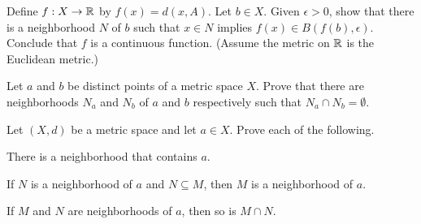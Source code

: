 Define $f: X \to \mathbb{R}$ by $f(x) = d(x,A)$. Let $b \in X$. Given $\epsilon > 0$, show that there is a neighborhood $N$ of $b$ such that $x \in N$ implies $f(x) \in B(f(b),\epsilon)$. Conclude that $f$ is a continuous function. (Assume the metric on $\mathbb{R}$ is the Euclidean metric.)


\begin{comment}

\ExerciseSolution Define $f: X \to \R$ by $f(x) = d(x,A)$. Let $b \in X$ and let $\epsilon$ be greater than $0$. Let $N = B(b, \epsilon)$.  We know that $N$ is a neighborhood of $b$. Suppose $x \in N$. Part i. shows that  
\[d(b,A) \leq d(b,x) + d(x,A) < \epsilon+d(x,A).\]
 So $d(b,A) - d(x,A) < \epsilon$ and $-\epsilon < d(x,A) - d(b,A)$. It follows that $|d(b,A) - d(x,A)| < \epsilon$ and $f(x) \in B(f(a),\epsilon)$.  This shows that $f$ is a continuous function.  


\end{comment}


\item Let $a$ and $b$ be distinct points of a metric space $X$. Prove that there are neighborhoods $N_a$ and $N_b$ of $a$ and $b$ respectively such that $N_a \cap N_b = \emptyset$.  

\begin{comment}

\ExerciseSolution Let $a$ and $b$ be distinct points of a metric space $(X,d)$. Since $a \neq b$, we know that $d(a,b) > 0$. Let $r = \frac{d(a,b)}{2}$. By definition, $N_a = B(a; r)$ and $N_b = B(b; r)$ are neighborhoods of $a$ and $b$ respectively. We will show that the intersection of $N_a$ and $N_b$ is empty. Assume to the contrary that there is an element $x$ in $N_a \cap N_b$. Then $d(x,a) < r$ and $d(x,b) < r$. It follows that 
\[d(a,b) \leq d(a,x) + d(x,b) < r + r = 2r = d(a,b).\]
Since this is impossible, we conclude that $N_a \cap N_b = \emptyset$ as desired. 

\end{comment}

\item \label{ex:Nghb_properties} Let $(X,d)$ be a metric space and let $a \in X$. Prove each of the following.

\ba
\item There is a neighborhood that contains $a$.
\item If $N$ is a neighborhood of $a$ and $N \subseteq M$, then $M$ is a neighborhood of $a$.
\item If $M$ and $N$ are neighborhoods of $a$, then so is $M \cap N$.
\ea

